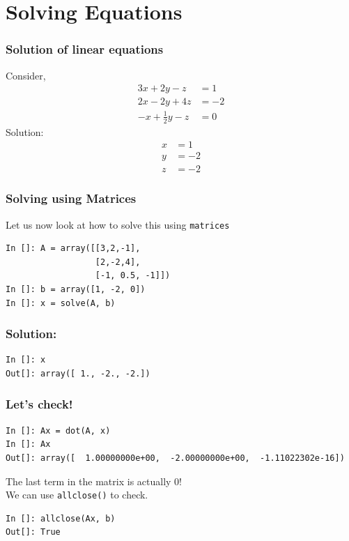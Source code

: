 \section{Solving Equations}

\begin{frame}[fragile]
\frametitle{Solution of linear equations}
Consider,
  \begin{align*}
    3x + 2y - z  & = 1 \\
    2x - 2y + 4z  & = -2 \\
    -x + \frac{1}{2}y -z & = 0
  \end{align*}
Solution:
  \begin{align*}
    x & = 1 \\
    y & = -2 \\
    z & = -2
  \end{align*}
\end{frame}

\begin{frame}[fragile]
\frametitle{Solving using Matrices}
Let us now look at how to solve this using \texttt{matrices}
  \begin{lstlisting}
In []: A = array([[3,2,-1],
                  [2,-2,4],                   
                  [-1, 0.5, -1]])
In []: b = array([1, -2, 0])
In []: x = solve(A, b)
  \end{lstlisting}
\end{frame}

\begin{frame}[fragile]
\frametitle{Solution:}
\begin{lstlisting}
In []: x
Out[]: array([ 1., -2., -2.])
\end{lstlisting}
\end{frame}

\begin{frame}[fragile]
\frametitle{Let's check!}
\begin{small}
\begin{lstlisting}
In []: Ax = dot(A, x)
In []: Ax
Out[]: array([  1.00000000e+00,  -2.00000000e+00,  -1.11022302e-16])
\end{lstlisting}
\end{small}
\begin{block}{}
The last term in the matrix is actually \alert{0}!\\
We can use \texttt{allclose()} to check.
\end{block}
\begin{lstlisting}
In []: allclose(Ax, b)
Out[]: True
\end{lstlisting}
\end{frame}

